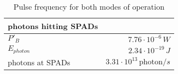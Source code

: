 \begin{table}[H]
\centering
\caption{Pulse frequency for both modes of operation}
\label{tab:photons_hitting_SPADs}
\begin{tabular}{|l|r|}\hline
    \textbf{photons hitting SPADs} & \\
    \hline 
    $P'_B$ & $7.76\cdot10^{-6}\,W$ \\
    $E_{photon}$ & $2.34\cdot10^{-19}\,J$ \\
    photons at SPADs & $3.31\cdot10^{13}\,\text{photon}/s$ \\
    \hline 
\end{tabular}
\end{table}
